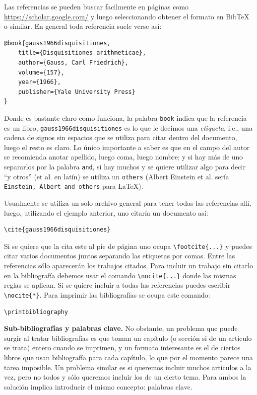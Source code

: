 Las referencias se pueden buscar facilmente en páginas como \url{https://scholar.google.com/} y luego seleccionando obtener el formato en Bib\TeX{} o similar. En general toda referencia suele verse así:
\begin{lstlisting}
@book{gauss1966disquisitiones,
	title={Disquisitiones arithmeticae},
	author={Gauss, Carl Friedrich},
	volume={157},
	year={1966},
	publisher={Yale University Press}
}
\end{lstlisting}
Donde es bastante claro como funciona, la palabra \texttt{book} indica que la referencia es un libro, \texttt{gauss1966disquisitiones} es lo que le decimos una \textit{etiqueta}, i.e., una cadena de signos sin espacios que se utiliza para citar dentro del documento, luego el resto es claro. Lo único importante a saber es que en el campo del autor se recomienda anotar apellido, luego coma, luego nombre; y si hay más de uno separarlos por la palabra \texttt{and}, si hay muchos y se quiere utilizar algo para decir ``y otros'' (et al. en latín) se utiliza un \texttt{others} (Albert Einstein et al. sería \texttt{Einstein, Albert and others} para \LaTeX{}).

Usualmente se utiliza un solo archivo general para tener todas las referencias allí, luego, utilizando el ejemplo anterior, uno citaría un documento así:
\begin{lstlisting}
\cite{gauss1966disquisitiones}
\end{lstlisting}
Si se quiere que la cita este al pie de página uno ocupa \lstinline|\footcite{...}| y puedes citar varios documentos juntos separando las etiquetas por comas. Entre las referencias sólo aparecerán los trabajos citados. Para incluir un trabajo sin citarlo en la bibliografía debemos usar el comando \lstinline|\nocite{...}| donde las mismas reglas se aplican.
Si se quiere incluir a todas las referencias puedes escribir \lstinline|\nocite{*}|. 
Para imprimir las bibliografías se ocupa este comando:
\begin{lstlisting}
\printbibliography
\end{lstlisting}

\textbf{Sub-bibliografías y palabras clave.} No obstante, un problema que puede surgir al tratar bibliografías es que toman un capítulo (o sección si de un artículo se trata) entero cuando se imprimen, y un formato interesante es el de ciertos libros que usan bibliografía para cada capítulo, lo que por el momento parece una tarea imposible. Un problema similar es si queremos incluir muchos artículos a la vez, pero no todos y sólo queremos incluir los de un cierto tema. Para ambos la solución implica introducir el mismo concepto: palabras clave.

